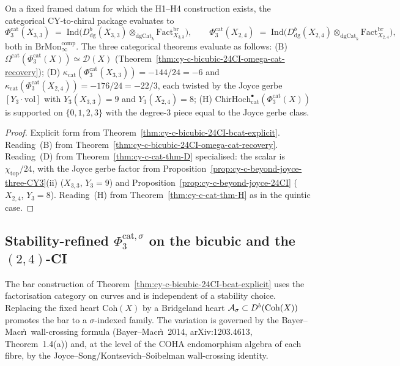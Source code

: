 \begin{corollary}
\label{cor:cy-c-bicubic-24CI-phi-three-cat}
On a fixed framed datum for which the H1--H4 construction exists, the
categorical CY-to-chiral package evaluates to
\[
 \Phi_3^{\mathrm{cat}}(X_{3,3})
 \;=\;
 \mathrm{Ind}\!\bigl(
 D^b_{\mathrm{dg}}(X_{3,3}) \otimes_{\mathrm{dgCat}_k}
 \mathrm{Fact}^{\mathrm{br}}_{X_{3,3}}
 \bigr),
\qquad
 \Phi_3^{\mathrm{cat}}(X_{2,4})
 \;=\;
 \mathrm{Ind}\!\bigl(
 D^b_{\mathrm{dg}}(X_{2,4}) \otimes_{\mathrm{dgCat}_k}
 \mathrm{Fact}^{\mathrm{br}}_{X_{2,4}}
 \bigr),
\]
both in $\mathrm{BrMon}^{\mathrm{comp}}_\infty$. The three categorical
theorems evaluate as follows:
\textup{(B)} $\Omega^{\mathrm{cat}}(\Phi_3^{\mathrm{cat}}(X)) \simeq \mathcal D(X)$
(Theorem~\ref{thm:cy-c-bicubic-24CI-omega-cat-recovery});
\textup{(D)} $\kappa_{\mathrm{cat}}(\Phi_3^{\mathrm{cat}}(X_{3,3})) = -144/24 = -6$
and $\kappa_{\mathrm{cat}}(\Phi_3^{\mathrm{cat}}(X_{2,4})) = -176/24 = -22/3$,
each twisted by the Joyce gerbe $[Y_3 \cdot \mathrm{vol}]$ with
$Y_3(X_{3,3}) = 9$ and $Y_3(X_{2,4}) = 8$;
\textup{(H)} $\mathrm{ChirHoch}^\bullet_{\mathrm{cat}}(\Phi_3^{\mathrm{cat}}(X))$
is supported on $\{0, 1, 2, 3\}$ with the degree-$3$ piece equal to the
Joyce gerbe class.
\end{corollary}

\begin{proof}
Explicit form from Theorem~\ref{thm:cy-c-bicubic-24CI-bcat-explicit}.
Reading~(B) from Theorem~\ref{thm:cy-c-bicubic-24CI-omega-cat-recovery}.
Reading~(D) from Theorem~\ref{thm:cy-c-cat-thm-D} specialised: the
scalar is $\chi_{\mathrm{top}}/24$, with the Joyce gerbe factor from
Proposition~\ref{prop:cy-c-beyond-joyce-three-CY3}(ii) ($X_{3,3}$,
$Y_3 = 9$) and Proposition~\ref{prop:cy-c-beyond-joyce-24CI}
($X_{2,4}$, $Y_3 = 8$). Reading~(H) from
Theorem~\ref{thm:cy-c-cat-thm-H} as in the quintic case.
\end{proof}

\subsection{Stability-refined \texorpdfstring{$\Phi_3^{\mathrm{cat},\sigma}$}{Phi-3-cat,sigma} on the bicubic and the \texorpdfstring{$(2,4)$}{(2,4)}-CI}
\label{subsec:cy-c-bicubic-24CI-stability-refined}

The bar construction of
Theorem~\ref{thm:cy-c-bicubic-24CI-bcat-explicit} uses the
factorisation category on curves and is independent of a stability
choice. Replacing the fixed heart $\mathrm{Coh}(X)$ by a Bridgeland
heart $\mathcal A_\sigma \subset D^b(\mathrm{Coh}(X))$ promotes the bar to a
$\sigma$-indexed family. The variation is governed by the
Bayer--Macr\`\i\ wall-crossing formula
(Bayer--Macr\`\i\ 2014, arXiv:1203.4613, Theorem~1.4(a)) and, at the
level of the COHA endomorphism algebra of each fibre, by the
Joyce--Song/Kontsevich--Soibelman wall-crossing identity.

